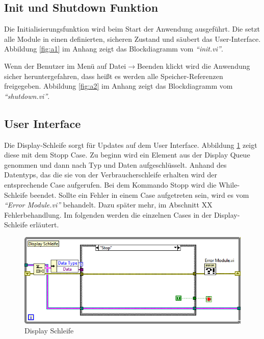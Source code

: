 		
		

\subsection{Init und Shutdown Funktion}	%
Die Initialisierungsfunktion wird beim Start der Anwendung ausgeführt. Die setzt alle Module in einen definierten, sicheren Zustand und säubert das User-Interface. Abbildung \ref{fig:a1} im Anhang zeigt das Blockdiagramm vom \textit{"`init.vi"'}.

Wenn der Benutzer im Menü auf Datei$\rightarrow$Beenden klickt wird die Anwendung sicher heruntergefahren, dass heißt es werden alle Speicher-Referenzen freigegeben. Abbildung \ref{fig:a2} im Anhang zeigt das Blockdiagramm vom \textit{"`shutdown.vi"'}.

\subsection{User Interface}
Die Display-Schleife sorgt für Updates auf dem User Interface.  Abbildung \ref{fig:disp} zeigt diese mit dem Stopp Case. Zu beginn wird ein Element aus der Display Queue genommen und dann nach Typ und Daten aufgeschlüsselt. Anhand des Datentyps, das die sie von der Verbraucherschleife erhalten wird der entsprechende Case aufgerufen. Bei dem Kommando Stopp wird die While-Schleife beendet. Sollte ein Fehler in einem Case aufgetreten sein, wird es vom \textit{"`Error Module.vi"'} behandelt. Dazu später mehr, im Abschnitt XX Fehlerbehandlung. Im folgenden werden die einzelnen Cases in der Display-Schleife erläutert.

	\begin{figure}[h!]
	\centering
		\includegraphics[width=\textwidth]{Pics/front-stop.png}
	\caption{Display Schleife}
	\label{fig:disp}
	\end{figure}

